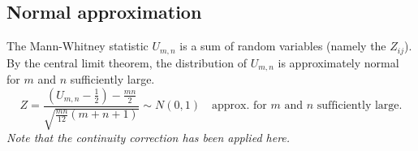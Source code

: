 \subsection{Normal approximation}

The Mann-Whitney statistic $U_{m,n}$ is a sum of random variables (namely the $Z_{ij}$). By the central limit theorem, the distribution of $U_{m,n}$ is approximately normal for $m$ and $n$ sufficiently large. 
\[
Z = \frac{(U_{m,n}-\frac{1}{2}) - \frac{mn}{2}}{\sqrt{\frac{mn}{12}(m+n+1)}} \sim  N(0,1)\quad\text{approx. for $m$ and $n$ sufficiently large.}
\]
\bit
\it Note that the continuity correction has been applied here.
\eit

%
%
%
%
%
%
%
%
%
%
%

